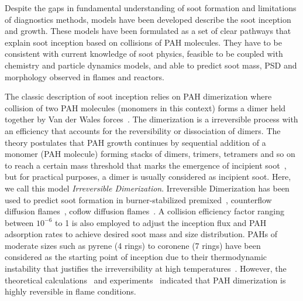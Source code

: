 Despite the gaps in fundamental understanding of soot formation and limitations of diagnostics methods, models have been developed describe the soot inception and growth. These models have been formulated as a set of clear pathways that explain soot inception based on collisions of PAH molecules. They have to be consistent with current knowledge of soot physics, feasible to be coupled with chemistry and particle dynamics models, and able to predict soot mass, PSD and morphology observed in flames and reactors.

The classic description of soot inception relies on PAH dimerization where collision of two PAH molecules (monomers in this context) forms a dimer held together by Van der Wales forces~\citep{frenklach1991detailed}. The dimerization is a irreversible process with an efficiency that accounts for the reversibility or dissociation of dimers. The theory postulates that PAH growth continues by sequential addition of a monomer (PAH molecule) forming stacks of dimers, trimers, tetramers and so on to reach a certain mass threshold that marks the emergence of incipient soot~\citep{frenklach1991detailed}, but for practical purposes, a dimer is usually considered as incipient soot. Here, we call this model \textit{Irreversible Dimerization}. 
Irreversible Dimerization has been used to predict soot formation in burner-stabilized premixed~\citep{salenbauch2015modeling, desgroux2017comparative}, counterflow diffusion flames~\citep{wang2015soot, xu2021experimental}, coflow diffusion flames~\citep{kholghy2016core, veshkini2016understanding}. A collision efficiency factor ranging between $10^{-6}$ to 1 is also employed to adjust the inception flux and PAH adsorption rates to achieve desired soot mass and size distribution. PAHs of moderate sizes such as pyrene (4 rings) to coronene (7 rings) have been considered as the starting point of inception due to their thermodynamic instability that justifies the irreversibility at high temperatures~\citep{frenklach1991detailed}. However, the theoretical calculations~\citep{miller1985calculations} and experiments~\citep{sabbah2010exploring} indicated that PAH dimerization is highly reversible in flame conditions.







